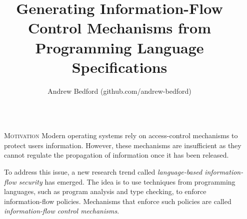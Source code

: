 \documentclass[final]{beamer}
\title{Generating Information-Flow Control Mechanisms from\\ Programming Language Specifications} %
\author{Andrew Bedford (github.com/andrew-bedford)} %
\institute{Laval University, Canada} %
\newlength{\sepwid}
\newlength{\onecolwid}
\begin{document}

\setlength{\belowcaptionskip}{2ex} %
\setlength\belowdisplayshortskip{2ex} %

\begin{frame}[fragile] %

\begin{columns}[t] %

\begin{column}{\sepwid}\end{column} %

\begin{column}{\onecolwid} %



\begin{block}{\textsc{Motivation}}
    Modern operating systems rely on access-control mechanisms to protect users information. However, these mechanisms are insufficient as they cannot regulate the propagation of information once it has been released. 
    
    \hspace{1.5cm}To address this issue, a new research trend called \emph{language-based information-flow security} has emerged. The idea is to use techniques from programming languages, such as program analysis and type checking, to enforce information-flow policies. Mechanisms that enforce such policies are called \emph{information-flow control mechanisms}. 
\end{block}


\end{column}
\end{columns}
\end{frame}
\end{document}

